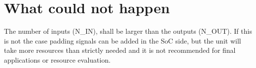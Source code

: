 \section{What could not happen}

The number of inputs (N\_IN), shall be larger than the outputs (N\_OUT). If this is not the case padding signals can be added in the SoC side, but the unit will take more resources than strictly needed and it is not recommended for final applications or resource evaluation.